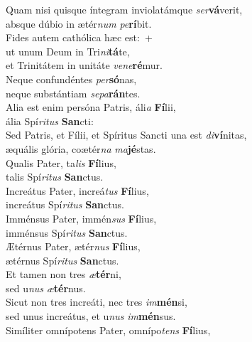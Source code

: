 \evenverse Quam nisi quisque íntegram inviolatámque \textit{ser}\textbf{vá}verit,~\*\\
\evenverse absque dúbio in ætér\textit{num} \textit{pe}\textbf{rí}bit.\\
\oddverse Fides autem cathólica hæc est:~+\\
\oddverse  ut unum Deum in Tri\textit{ni}\textbf{tá}te,~\*\\
\oddverse et Trinitátem in unitáte \textit{ve}\textit{ne}\textbf{ré}mur.\\
\evenverse Neque confundéntes \textit{per}\textbf{só}nas,~\*\\
\evenverse neque substántiam \textit{se}\textit{pa}\textbf{rán}tes.\\
\oddverse Alia est enim persóna Patris, áli\textit{a} \textbf{Fí}lii,~\*\\
\oddverse ália Spí\textit{ri}\textit{tus} \textbf{San}cti:\\
\evenverse Sed Patris, et Fílii, et Spíritus Sancti una est \textit{di}\textbf{ví}nitas,~\*\\
\evenverse æquális glória, coætér\textit{na} \textit{ma}\textbf{jé}stas.\\
\oddverse Qualis Pater, ta\textit{lis} \textbf{Fí}lius,~\*\\
\oddverse talis Spí\textit{ri}\textit{tus} \textbf{San}ctus.\\
\evenverse Increátus Pater, increá\textit{tus} \textbf{Fí}lius,~\*\\
\evenverse increátus Spí\textit{ri}\textit{tus} \textbf{San}ctus.\\
\oddverse Imménsus Pater, immén\textit{sus} \textbf{Fí}lius,~\*\\
\oddverse imménsus Spí\textit{ri}\textit{tus} \textbf{San}ctus.\\
\evenverse Ætérnus Pater, ætér\textit{nus} \textbf{Fí}lius,~\*\\
\evenverse ætérnus Spí\textit{ri}\textit{tus} \textbf{San}ctus.\\
\oddverse Et tamen non tres \textit{æ}\textbf{tér}ni,~\*\\
\oddverse sed u\textit{nus} \textit{æ}\textbf{tér}nus.\\
\evenverse Sicut non tres increáti, nec tres \textit{im}\textbf{mén}si,~\*\\
\evenverse sed unus increátus, et u\textit{nus} \textit{im}\textbf{mén}sus.\\
\oddverse Simíliter omnípotens Pater, omnípo\textit{tens} \textbf{Fí}lius,~\*\\
